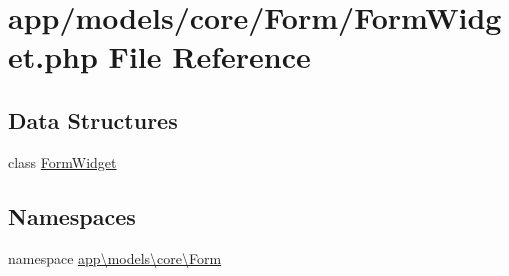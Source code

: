 \hypertarget{_form_widget_8php}{\section{app/models/core/\-Form/\-Form\-Widget.php File Reference}
\label{_form_widget_8php}
}
\subsection*{Data Structures}
\begin{DoxyCompactItemize}
\item 
class \hyperlink{classapp_1_1models_1_1core_1_1_form_1_1_form_widget}{Form\-Widget}
\end{DoxyCompactItemize}
\subsection*{Namespaces}
\begin{DoxyCompactItemize}
\item 
namespace \hyperlink{namespaceapp_1_1models_1_1core_1_1_form}{app\textbackslash{}models\textbackslash{}core\textbackslash{}\-Form}
\end{DoxyCompactItemize}
